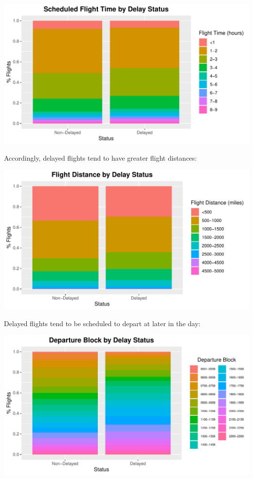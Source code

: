 \documentclass[
]{article}
\begin{document}
\begin{center}\includegraphics{Visualisation_Analysis_files/figure-latex/features_plt_6-1} \end{center}
\newpage

Accordingly, delayed flights tend to have greater flight distances:

\begin{center}\includegraphics{Visualisation_Analysis_files/figure-latex/features_plt_7-1} \end{center}

Delayed flights tend to be scheduled to depart at later in the day:

\begin{center}\includegraphics{Visualisation_Analysis_files/figure-latex/features_plt_8-1} \end{center}
\newpage
\end{document}
